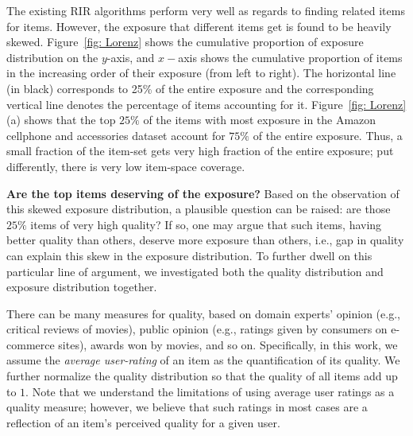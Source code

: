 The existing RIR algorithms perform very well as regards to finding related items for items. However, the exposure that different items get is found to be heavily skewed. Figure~\ref{fig: Lorenz} shows the cumulative proportion of exposure distribution on the $y$-axis, and $x-$axis shows the cumulative proportion of items in the increasing order of their exposure (from left to right). The horizontal line (in black) corresponds to 25\% of the entire exposure and the corresponding vertical line denotes the percentage of items accounting for it.
Figure~\ref{fig: Lorenz}(a) shows that the top $25\%$ of the items with most exposure in the Amazon cellphone and accessories dataset account for $75\%$ of the entire exposure. Thus, a small fraction of the item-set gets very high fraction of the entire exposure; put differently, there is very low item-space coverage.

\vspace{1 mm}
\noindent
\textbf{Are the top items deserving of the exposure?} Based on the observation of this skewed exposure distribution, a plausible question can be raised: are those $25 \%$ items of very high quality? If so, one may argue that such items, having better quality than others, deserve more exposure than others, i.e., gap in quality can explain this skew in the exposure distribution. To further dwell on this particular line of argument, we investigated both the quality distribution and exposure distribution together. 


There can be many measures for quality,
based on domain experts' opinion (e.g., critical reviews of movies), public opinion (e.g., ratings given by consumers on e-commerce sites), awards won by movies, and so on. Specifically, in this work, we assume the {\it average user-rating} of an item as the quantification of its quality. We further normalize the quality distribution so that the quality of all items add up to $1$. Note that we understand the limitations of using average user ratings as a quality measure; however, we believe that such ratings in most cases are a reflection of an item's perceived quality for a given user.


